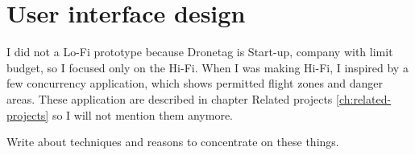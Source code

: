 \chapter{User interface design}\label{ch:user-interface-design}


I did not a Lo-Fi prototype because Dronetag is Start-up, company with limit budget, so I focused only on the Hi-Fi.
When I was making Hi-Fi, I inspired by a few concurrency application, which shows permitted flight zones and danger areas.
These application are described in chapter Related projects \ref{ch:related-projects} so I will not mention them anymore.

Write about techniques and reasons to concentrate on these things.



